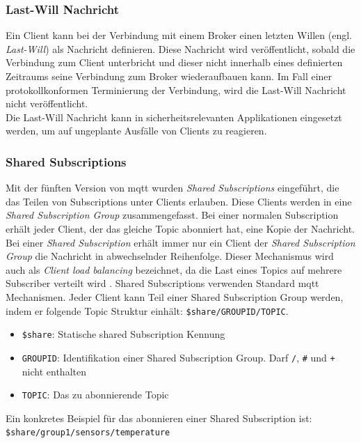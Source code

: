 \subsubsection{Last-Will Nachricht} \label{s:last-will}
Ein Client kann bei der Verbindung mit einem Broker einen letzten Willen (engl. \textit{Last-Will}) als Nachricht definieren. Diese Nachricht wird veröffentlicht, sobald die Verbindung zum Client unterbricht und dieser nicht innerhalb eines definierten Zeitraums seine Verbindung zum Broker wiederaufbauen kann.
Im Fall einer protokollkonformen Terminierung der Verbindung, wird die Last-Will Nachricht nicht veröffentlicht.
\cite{soniSURVEYMQTTPROTOCOL}\\
Die Last-Will Nachricht kann in sicherheitsrelevanten Applikationen eingesetzt werden, um auf ungeplante Ausfälle von Clients zu reagieren.

\subsubsection{Shared Subscriptions} \label{s:shared-subsriptions}
Mit der fünften Version von \ac{mqtt} wurden \textit{Shared Subscriptions} eingeführt, die das Teilen von Subscriptions unter Clients erlauben. Diese Clients werden in eine \textit{Shared Subscription Group} zusammengefasst. Bei einer normalen Subscription erhält jeder Client, der das gleiche Topic abonniert hat, eine Kopie der Nachricht. Bei einer \textit{Shared Subscription} erhält immer nur ein Client der \textit{Shared Subscription Group} die Nachricht in abwechselnder Reihenfolge. Dieser Mechanismus wird auch als \textit{Client load balancing} bezeichnet, da die Last eines Topics auf mehrere Subscriber verteilt wird \cite{raschbichlerMQTTHowNew}.
Shared Subscriptions verwenden Standard \ac{mqtt} Mechanismen. Jeder Client kann Teil einer Shared Subscription Group werden, indem er folgende Topic Struktur einhält: \verb|$share/GROUPID/TOPIC|.
\begin{itemize}
    \item \verb|$share|: Statische shared Subscription Kennung
    \item \verb|GROUPID|: Identifikation einer Shared Subscription Group. Darf \verb|/|, \verb|#| und \verb|+| nicht enthalten
    \item \verb|TOPIC|: Das zu abonnierende Topic
\end{itemize}
Ein konkretes Beispiel für das abonnieren einer Shared Subscription ist:
\newline
\verb|$share/group1/sensors/temperature|


